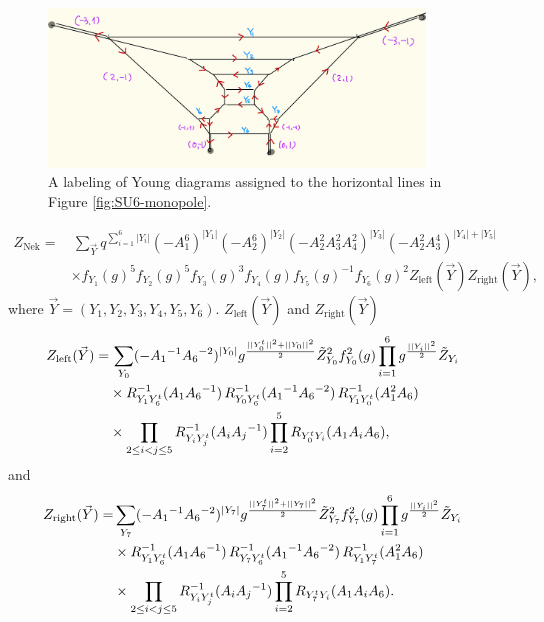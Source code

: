\documentclass[11pt,a4paper]{article}
\newcommand{\nn}{\nonumber}
\begin{document}
\begin{figure}[t]
\centering
\includegraphics[width=10cm]{SU6young.jpeg}
\caption{A labeling of Young diagrams assigned to the horizontal lines in Figure \ref{fig:SU6-monopole}.}
\label{fig:SU6young}
\end{figure}

\begin{align}
Z_{\text{Nek}} 
=&\, \sum_{\vec{Y}}q^{\sum_{i=1}^6|Y_i|} (-A_1^6)^{|Y_1|}(-A_2^6)^{|Y_2|}(-A_2^2A_3^2A_4^2)^{|Y_3|}(-A_2^2A_3^4)^{|Y_4| + |Y_5|}\nn\\
&\times f_{Y_1}(g)^5f_{Y_2}(g)^5f_{Y_3}(g)^3f_{Y_4}(g)f_{Y_5}(g)^{-1}f_{Y_6}(g)^{2}Z_{\text{left}}(\vec{Y})Z_{\text{right}}(\vec{Y}), \label{Znek1}
\end{align}
where $\vec{Y}=(Y_1, Y_2, Y_3, Y_4, Y_5, Y_6)$.
$Z_{\text{left}}(\vec{Y})$ and $Z_{\text{right}}(\vec{Y})$ 
\begin{align}
Z_{\text{left}}(\vec{Y})=& \,
\sum_{Y_0} ( - A_1{}^{-1} A_6{}^{-2})^{|Y_0|} 
g^{\frac{||Y_0^t||^2+||Y_0||^2}{2}} \tilde{Z}_{Y_0}^2 f_{Y_0}^2(g)
\prod_{i=1}^6 g^{\frac{||Y_i||^2}{2}} \tilde{Z}_{Y_i} 
\cr 
& 
\times 
R_{Y_1 Y_6^t}^{-1} (A_1 A_6{}^{-1})\,R_{Y_0 Y_6^t}^{-1} (A_1{}^{-1} A_6{}^{-2})\,R_{Y_1Y_0^t }^{-1} (A_1^2A_6) \cr 
& 
\times  
 \prod_{2 \le i <  j \le 5} R_{Y_i Y_j^t}^{-1} (A_i A_j{}^{-1})
 \prod_{i=2}^5 R_{Y_0^t Y_i} (A_1 A_i  A_6) ,
\end{align}
and
\begin{align}
Z_{\text{right}}(\vec{Y})=&
\sum_{Y_7} ( - A_1{}^{-1} A_6{}^{-2})^{|Y_7|} 
g^{\frac{||Y_7^t||^2+||Y_7||^2}{2}} \tilde{Z}_{Y_7}^2 f_{Y_7}^2(g)
\prod_{i=1}^6 g^{\frac{||Y_i||^2}{2}} \tilde{Z}_{Y_i} 
\cr 
& 
\times 
R_{Y_1 Y_6^t}^{-1} (A_1 A_6{}^{-1})\,R_{Y_7 Y_6^t}^{-1} (A_1{}^{-1} A_6{}^{-2})\,R_{Y_1Y_7^t }^{-1} (A_1^2A_6) \cr 
& 
\times  
 \prod_{2 \le i <  j \le 5} R_{Y_i Y_j^t}^{-1} (A_i A_j{}^{-1})
 \prod_{i=2}^5 R_{Y_7^t Y_i} (A_1 A_i  A_6) .
\end{align}
\end{document}
